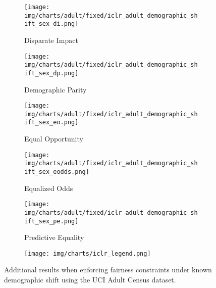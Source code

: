 \begin{figure*}[h!]
    \begin{subfigure}[b]{1\linewidth}
        \texttt{[image: img/charts/adult/fixed/iclr\_adult\_demographic\_shift\_sex\_di.png]}
        \caption{Disparate Impact}
    \end{subfigure} 
    \begin{subfigure}[b]{1\linewidth}
        \texttt{[image: img/charts/adult/fixed/iclr\_adult\_demographic\_shift\_sex\_dp.png]}
        \caption{Demographic Parity}
    \end{subfigure}
    \begin{subfigure}[b]{1\linewidth}
        \texttt{[image: img/charts/adult/fixed/iclr\_adult\_demographic\_shift\_sex\_eo.png]}
        \caption{Equal Opportunity}
    \end{subfigure} 
    \begin{subfigure}[b]{1\linewidth}
        \texttt{[image: img/charts/adult/fixed/iclr\_adult\_demographic\_shift\_sex\_eodds.png]}
        \caption{Equalized Odds}
    \end{subfigure} 
    \begin{subfigure}[b]{1\linewidth}
        \texttt{[image: img/charts/adult/fixed/iclr\_adult\_demographic\_shift\_sex\_pe.png]}
        \caption{Predictive Equality}
    \end{subfigure} 
    \begin{subfigure}[b]{1\linewidth}
        \texttt{[image: img/charts/iclr\_legend.png]}
    \end{subfigure}
    \caption{Additional results when enforcing fairness constraints under known demographic shift
using the UCI Adult Census dataset.
}
\end{figure*}
\clearpage
